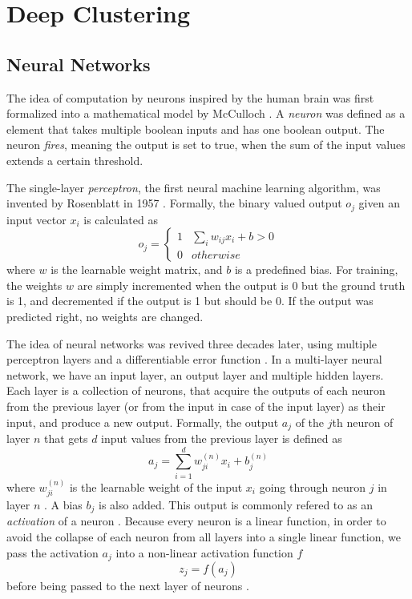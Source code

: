 \section{Deep Clustering}
\subsection{Neural Networks}

The idea of computation by neurons inspired by the human brain was first formalized into a mathematical model by McCulloch \cite{neural_network_1943}. A \textit{neuron} was defined as a element that takes multiple boolean inputs and has one boolean output. The neuron \textit{fires}, meaning the output is set to true, when the sum of the input values extends a certain threshold.

The single-layer \textit{perceptron}, the first neural machine learning algorithm, was invented by Rosenblatt in 1957 \cite{perceptron}. Formally, the binary valued output $o_j$ given an input vector $x_i$ is calculated as
$$o_j = 
\begin{cases}
    1 & \sum_i w_{ij}x_i + b > 0\\
    0 & otherwise
\end{cases}
$$
where $w$ is the learnable weight matrix, and $b$ is a predefined bias. For training, the weights $w$ are simply incremented when the output is 0 but the ground truth is 1, and decremented if the output is 1 but should be 0. If the output was predicted right, no weights are changed.

The idea of neural networks was revived three decades later, using multiple perceptron layers and a differentiable error function \cite{hidden_layer_backprop}. In a multi-layer neural network, we have an input layer, an output layer and multiple hidden layers. Each layer is a collection of neurons, that acquire the outputs of each neuron from the previous layer (or from the input in case of the input layer) as their input, and produce a new output. Formally, the output $a_j$ of the $j$th neuron of layer $n$ that gets $d$ input values from the previous layer is defined as
$$a_j = \sum^d_{i=1}w_{ji}^{(n)}x_i + b_j^{(n)}$$
where $w_{ji}^{(n)}$ is the learnable weight of the input $x_i$ going through neuron $j$ in layer $n$ \cite{neural_networks_pattern_recognition}. A bias $b_j$ is also added. This output is commonly refered to as an \textit{activation} of a neuron \cite{neural_networks_pattern_recognition}. Because every neuron is a linear function, in order to avoid the collapse of each neuron from all layers into a single linear function, we pass the activation $a_j$ into a non-linear activation function $f$
$$z_j = f(a_j)$$
before being passed to the next layer of neurons \cite{activation_functions}.


